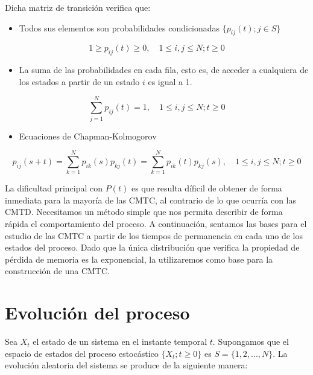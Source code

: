 \documentclass[
]{book}
\providecommand{\tightlist}{%
  \setlength{\itemsep}{0pt}\setlength{\parskip}{0pt}}
\theoremstyle{definition}
\theoremstyle{definition}
\theoremstyle{definition}
\theoremstyle{definition}
\theoremstyle{remark}
\begin{document}
Dicha matriz de transición verifica que:

\begin{itemize}
\tightlist
\item
  Todos sus elementos son probabilidades condicionadas \(\{p_{ij}(t); j \in S\}\)
\end{itemize}

\[1 \geq p_{ij}(t) \geq 0, \quad  1 \leq i, j \leq N; t \geq 0\]

\begin{itemize}
\tightlist
\item
  La suma de las probabilidades en cada fila, esto es, de acceder a cualquiera de los estados a partir de un estado \(i\) es igual a 1.
\end{itemize}

\[\sum_{j=1}^N p_{ij}(t) = 1, \quad  1 \leq i, j \leq N; t \geq 0\]

\begin{itemize}
\tightlist
\item
  Ecuaciones de Chapman-Kolmogorov
\end{itemize}

\[p_{ij}(s+t) =  \sum_{k=1}^N p_{ik}(s)p_{kj}(t) =  \sum_{k=1}^N p_{ik}(t)p_{kj}(s)   , \quad  1 \leq i, j \leq N; t \geq 0\]

La dificultad principal con \(P(t)\) es que resulta díficil de obtener de forma inmediata para la mayoría de las CMTC, al contrario de lo que ocurría con las CMTD. Necesitamos un método simple que nos permita describir de forma rápida el comportamiento del proceso. A continuación, sentamos las bases para el estudio de las CMTC a partir de los tiempos de permanencia en cada uno de los estados del proceso. Dado que la única distribución que verifica la propiedad de pérdida de memoria es la exponencial, la utilizaremos como base para la construcción de una CMTC.

\hypertarget{CMTCA}{%
\section{Evolución del proceso}\label{CMTCA}}

Sea \(X_t\) el estado de un sistema en el instante temporal \(t\). Supongamos que el espacio de estados del proceso estocástico \(\{X_t; t \geq 0\}\) es \(S=\{1, 2,...,N\}\). La evolución aleatoria del sistema se produce de la siguiente manera:
\end{document}
